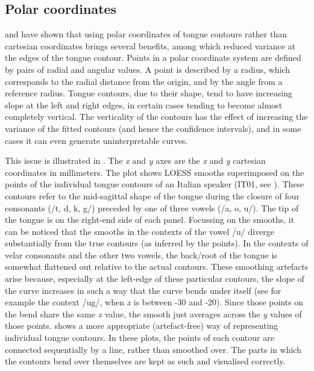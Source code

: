 \documentclass[11pt,]{article}
\begin{document}
\hypertarget{polar-coordinates}{%
\subsection{Polar coordinates}\label{polar-coordinates}}

\citet{mielke2015} and \citet{heyne2015a, heyne2015} have shown that
using polar coordinates of tongue contours rather than cartesian
coordinates brings several benefits, among which reduced variance at the
edges of the tongue contour. Points in a polar coordinate system are
defined by pairs of radial and angular values. A point is described by a
radius, which corresponds to the radial distance from the origin, and by
the angle from a reference radius. Tongue contours, due to their shape,
tend to have increasing slope at the left and right edges, in certain
cases tending to become almost completely vertical. The verticality of
the contours has the effect of increasing the variance of the fitted
contours (and hence the confidence intervals), and in some cases it can
even generate uninterpretable curves.

This issue is illustrated in . The \emph{x} and \emph{y}
axes are the \emph{x} and \emph{y} cartesian coordinates in millimeters.
The plot shows LOESS smooths superimposed on the points of the
individual tongue contours of an Italian speaker (IT01, see
). These contours refer to the mid-sagittal shape of the
tongue during the closure of four consonants (/t, d, k, g/) preceded by
one of three vowels (/a, o, u/). The tip of the tongue is on the
right-end side of each panel. Focussing on the smooths, it can be
noticed that the smooths in the contexts of the vowel /u/ diverge
substantially from the true contours (as inferred by the points). In the
contexts of velar consonants and the other two vowels, the back/root of
the tongue is somewhat flattened out relative to the actual contours.
These smoothing artefacts arise because, especially at the left-edge of
these particular contours, the slope of the curve increases in such a
way that the curve bends under itself (see for example the context /ug/,
when \emph{x} is between -30 and -20). Since those points on the bend
share the same \emph{x} value, the smooth just averages across the
\emph{y} values of those points.  shows a more appropriate
(artefact-free) way of representing individual tongue contours. In these
plots, the points of each contour are connected sequentially by a line,
rather than smoothed over. The parts in which the contours bend over
themselves are kept as such and visualised correctly.
\end{document}
